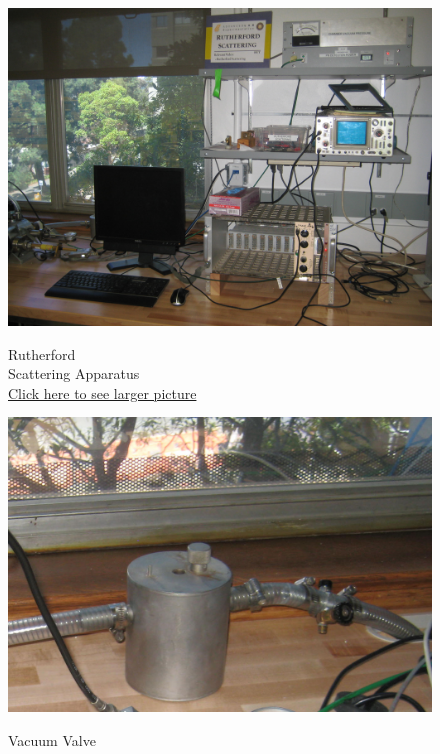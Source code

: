 \documentclass{../lab}
\begin{document}
\begin{figure}[H]
\captionsetup{justification=centering}
  \href{http://experimentationlab.berkeley.edu/sites/default/files/images/RUT_3512.jpg}{\includegraphics[width=\linewidth,keepaspectratio]{images/RUT_3512.jpg}}
  \caption{Rutherford \\ Scattering Apparatus \\ \href{http://experimentationlab.berkeley.edu/sites/default/files/images/RUT_3512.jpg}{Click here to see larger picture}}
  \label{fig:Apparatus}
\endminipage\hfill
{}
  \href{http://experimentationlab.berkeley.edu/sites/default/files/images/RUT_Valve.jpg}{\includegraphics[width=\linewidth,keepaspectratio]{images/RUT_Valve.jpg}}
  \caption{Vacuum Valve \\
}
\end{figure}
\end{document}
